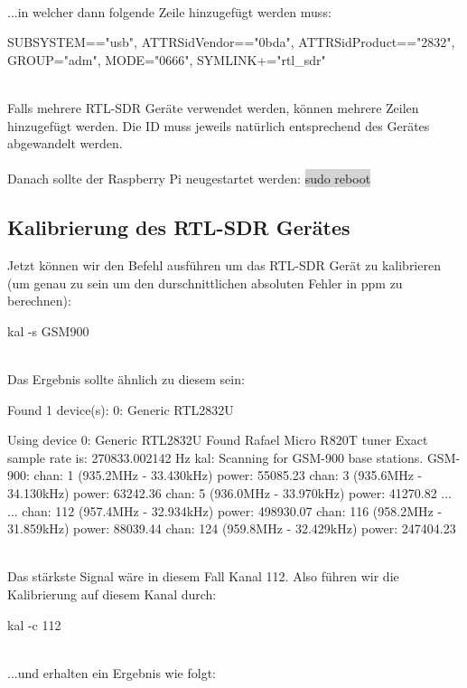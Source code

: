 \noindent\\...in welcher dann folgende Zeile hinzugefügt werden muss:

\begin{code}
SUBSYSTEM=="usb", ATTRS{idVendor}=="0bda", ATTRS{idProduct}=="2832", GROUP="adm", MODE="0666", SYMLINK+="rtl_sdr"
\end{code}

\noindent\\Falls mehrere RTL-SDR Geräte verwendet werden, können mehrere Zeilen hinzugefügt werden. Die ID muss jeweils natürlich entsprechend des Gerätes abgewandelt werden.\\
\\Danach sollte der Raspberry Pi neugestartet werden: \colorbox{lightgray}{sudo reboot}

\subsection{Kalibrierung des RTL-SDR Gerätes}
Jetzt können wir den Befehl ausführen um das RTL-SDR Gerät zu kalibrieren (um genau zu sein um den durschnittlichen absoluten Fehler in ppm zu berechnen):

\begin{code}
kal -s GSM900 
\end{code}

\noindent\\Das Ergebnis sollte ähnlich zu diesem sein:

\begin{code}
Found 1 device(s):
  0:  Generic RTL2832U

Using device 0: Generic RTL2832U
Found Rafael Micro R820T tuner
Exact sample rate is: 270833.002142 Hz
kal: Scanning for GSM-900 base stations.
GSM-900:
	chan: 1 (935.2MHz - 33.430kHz)	power: 55085.23
	chan: 3 (935.6MHz - 34.130kHz)	power: 63242.36
	chan: 5 (936.0MHz - 33.970kHz)	power: 41270.82
...
...
	chan: 112 (957.4MHz - 32.934kHz)	power: 498930.07
	chan: 116 (958.2MHz - 31.859kHz)	power: 88039.44
	chan: 124 (959.8MHz - 32.429kHz)	power: 247404.23
\end{code}

\noindent\\Das stärkste Signal wäre in diesem Fall Kanal 112. Also führen wir die Kalibrierung auf diesem Kanal durch:

\begin{code}
kal -c 112 
\end{code}

\noindent\\...und erhalten ein Ergebnis wie folgt:

